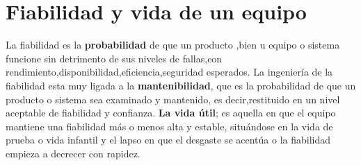 \documentclass[
	12pt, %
	fleqn, %
	a4paper, %
	oneside, %
]{LegrandOrangeBook}
\begin{document}
\section{Fiabilidad y vida de un equipo}
La fiabilidad es la \textbf{probabilidad} de que un producto ,bien u equipo o sistema funcione sin detrimento de sus niveles de fallas,con rendimiento,disponibilidad,eficiencia,seguridad esperados. La ingeniería de la fiabilidad esta muy ligada a la \textbf{mantenibilidad}, que es la probabilidad de que un producto o sistema sea examinado y mantenido, es decir,restituido en un nivel aceptable de fiabilidad y confianza. \textbf{La vida útil}; es aquella en que el equipo mantiene una fiabilidad más o menos alta y estable, situándose en la vida de prueba o vida infantil y el lapso en que el desgaste se acentúa o la fiabilidad empieza a decrecer con rapidez.
\end{document}

